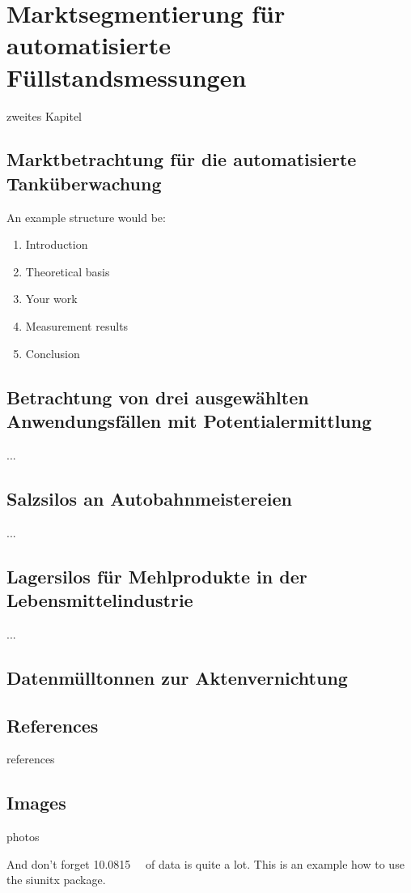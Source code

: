 \chapter{Marktsegmentierung für automatisierte F{\"u}llstandsmessungen}
zweites Kapitel


\section{Marktbetrachtung für die automatisierte Tank{\"u}berwachung}

An example structure would be:
\begin{enumerate}
\item Introduction
\item Theoretical basis
\item Your work
\item Measurement results
\item Conclusion
\end{enumerate}

\section{Betrachtung von drei ausgew{\"a}hlten Anwendungsf{\"a}llen mit Potentialermittlung}
...

\section{Salzsilos an Autobahnmeistereien}
...

\section{Lagersilos für Mehlprodukte in der Lebensmittelindustrie}
...

\section{Datenmülltonnen zur Aktenvernichtung}


\section{References}
references

\section{Images}
photos


And don't forget \SI{10.0815}{\giga\byte} of data is quite a lot.
This is an example how to use the siunitx package.

